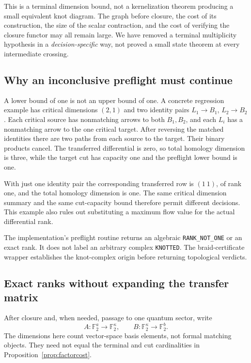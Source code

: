 \documentclass[11pt,letterpaper]{article}
\theoremstyle{definition}\newtheorem{definition}[theorem]{Definition}
\theoremstyle{remark}\newtheorem{remark}[theorem]{Remark}
\newcommand{\F}{\mathbb F_2}
\newcommand{\code}[1]{\texttt{#1}}
\begin{document}
This is a terminal dimension bound, not a kernelization theorem producing a
small equivalent knot diagram. The graph before closure, the cost of its
construction, the size of the scalar contraction, and the cost of verifying
the closure functor may all remain large. We have removed a terminal
multiplicity hypothesis in a \emph{decision-specific} way, not proved a small
state theorem at every intermediate crossing.

\subsection{Why an inconclusive preflight must continue}
A lower bound of one is not an upper bound of one. A concrete regression
example has critical dimensions $(2,1)$ and two identity pairs
$L_1\to B_1$, $L_2\to B_2$. Each critical source has nonmatching arrows to both
$B_1,B_2$, and each $L_i$ has a nonmatching arrow to the one critical target.
After reversing the matched identities there are two paths from each source
to the target. Their binary products cancel. The transferred differential
is zero, so total homology dimension is three, while the target cut has
capacity one and the preflight lower bound is one.

With just one identity pair the corresponding transferred row is
$(1\ 1)$, of rank one, and the total homology dimension is one. The same
critical dimension summary and the same cut-capacity bound therefore permit
different decisions. This example also rules out substituting a maximum
flow value for the actual differential rank.

The implementation's preflight routine returns an algebraic
\code{RANK\_NOT\_ONE} or an exact rank. It does not label an arbitrary
complex \code{KNOTTED}. The braid-certificate wrapper establishes the
knot-complex origin before returning topological verdicts.

\subsection{Exact ranks without expanding the transfer matrix}
After closure and, when needed, passage to one quantum sector, write
\[
 A:\F^a\to\F^\kappa,\qquad B:\F^\kappa\to\F^b.
\]
The dimensions here count vector-space basis elements, not formal matching
objects. They need not equal the terminal and cut cardinalities in
Proposition~\ref{prop:factorcost}.
\end{document}
